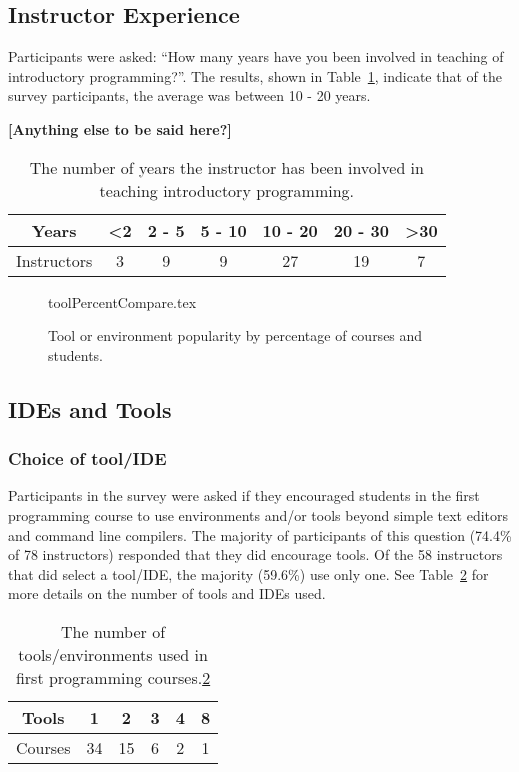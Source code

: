 \documentclass{sig-alternate}
\begin{document}
\subsection{Instructor Experience}
Participants were asked: ``How many years have you been involved in
teaching of introductory programming?''. The results, shown in
Table~\ref{tab:yearsTeaching}, indicate that of the survey
participants, the average was between 10 - 20 years.

{\bf{[Anything else to be said here?]}}

\begin{table}[ht]
\centering
\caption{The number of years the instructor has been involved in teaching introductory programming.}
\label{tab:yearsTeaching}
\begin{tabular}{ccccccc}
\hline
Years       & \textless 2 & 2 - 5 & 5 - 10 & 10 - 20 & 20 - 30 & \textgreater 30 \\ \hline
Instructors & 3          & 9     & 9      & 27      & 19      & 7              \\ \hline
\end{tabular}
\end{table}




\begin{figure}[ht]
\begin{center}
{toolPercentCompare.tex}
\caption{Tool or environment popularity by percentage of courses and students.\label{fig:tools}}
\end{center}
\end{figure}


\subsection{IDEs and Tools}
\subsubsection{Choice of tool/IDE}
Participants in the survey were asked if they encouraged students in the first programming course to use environments and/or tools beyond simple text editors and command line compilers. The majority of participants of this question (74.4\% of 78 instructors) responded that they did encourage tools. Of the 58 instructors that did select a tool/IDE, the majority (59.6\%) use only one. See Table~\ref{tab:numTools} for more details on the number of tools and IDEs used.

\begin{table}[]
\centering
\caption{The number of tools/environments used in first programming courses.\ref{tab:numTools}}
\label{tab:numTools}
\begin{tabular}{cccccc}
\hline
Tools   & 1  & 2  & 3 & 4 & 8 \\ \hline
Courses & 34 & 15 & 6 & 2 & 1 \\ \hline
\end{tabular}
\end{table}
\end{document}
